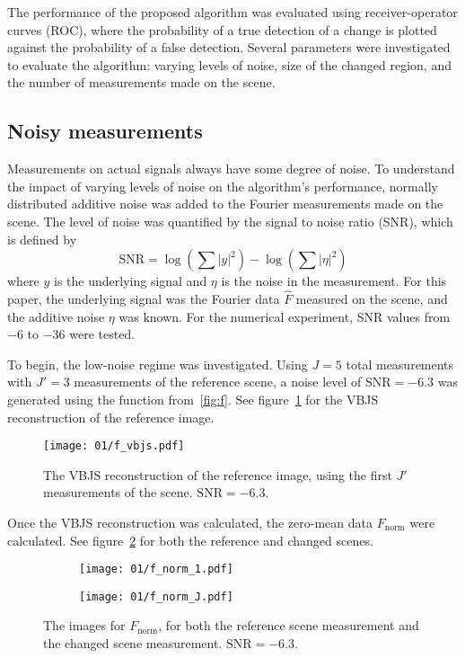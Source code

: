 \documentclass{article}
\begin{document}
The performance of the proposed algorithm was evaluated using receiver-operator curves (ROC), where the probability of a true detection of a change is plotted against the probability of a false detection. Several parameters were investigated to evaluate the algorithm: varying levels of noise, size of the changed region, and the number of measurements made on the scene.

\subsection{Noisy measurements}

Measurements on actual signals always have some degree of noise. To understand the impact of varying levels of noise on the algorithm's performance, normally distributed additive noise was added to the Fourier measurements made on the scene. The level of noise was quantified by the signal to noise ratio (SNR), which is defined by
\[
\text{SNR} = \log\left( \sum |y|^2 \right) - \log\left( \sum |\eta|^2 \right)
\]
where $y$ is the underlying signal and $\eta$ is the noise in the measurement. For this paper, the underlying signal was the Fourier data $\hat{F}$ measured on the scene, and the additive noise $\eta$ was known. For the numerical experiment, SNR values from $-6$ to $-36$ were tested.

To begin, the low-noise regime was investigated. Using $J=5$ total measurements with $J'=3$ measurements of the reference scene, a noise level of $\text{SNR}=-6.3$ was generated using the function from~\ref{fig:f}. See figure~\ref{fig:f_vbjs} for the VBJS reconstruction of the reference image.

\begin{figure}[H]
   \centering
   \texttt{[image: 01/f\_vbjs.pdf]}
   \caption{The VBJS reconstruction of the reference image, using the first $J'$ measurements of the scene. $\text{SNR} = -6.3$.}
   \label{fig:f_vbjs}
\end{figure}

Once the VBJS reconstruction was calculated, the zero-mean data $F_\text{norm}$ were calculated. See figure~\ref{fig:f_norm} for both the reference and changed scenes.

\begin{figure}[H]
   \centering
   \begin{subfigure}{0.5\textwidth}
       \centering
       \texttt{[image: 01/f\_norm\_1.pdf]}
   \end{subfigure}%
   \begin{subfigure}{0.5\textwidth}
       \centering
       \texttt{[image: 01/f\_norm\_J.pdf]}
   \end{subfigure}%
   \caption{The images for $F_\text{norm}$, for both the reference scene measurement and the changed scene measurement. $\text{SNR} = -6.3$.}
   \label{fig:f_norm}
\end{figure}
\end{document}
